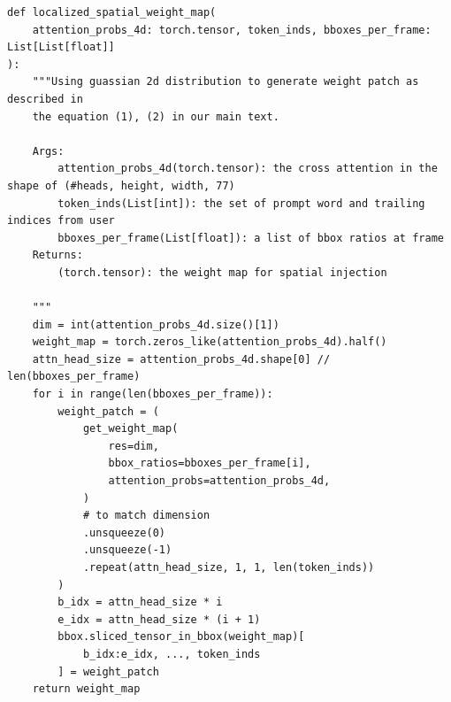 \begin{tiny}
\begin{verbatim}
def localized_spatial_weight_map(
    attention_probs_4d: torch.tensor, token_inds, bboxes_per_frame: List[List[float]]
):
    """Using guassian 2d distribution to generate weight patch as described in
    the equation (1), (2) in our main text.

    Args:
        attention_probs_4d(torch.tensor): the cross attention in the shape of (#heads, height, width, 77)
        token_inds(List[int]): the set of prompt word and trailing indices from user
        bboxes_per_frame(List[float]): a list of bbox ratios at frame
    Returns:
        (torch.tensor): the weight map for spatial injection

    """
    dim = int(attention_probs_4d.size()[1])
    weight_map = torch.zeros_like(attention_probs_4d).half()
    attn_head_size = attention_probs_4d.shape[0] // len(bboxes_per_frame)
    for i in range(len(bboxes_per_frame)):
        weight_patch = (
            get_weight_map(
                res=dim,
                bbox_ratios=bboxes_per_frame[i],
                attention_probs=attention_probs_4d,
            )
            # to match dimension
            .unsqueeze(0)
            .unsqueeze(-1)
            .repeat(attn_head_size, 1, 1, len(token_inds))
        )
        b_idx = attn_head_size * i
        e_idx = attn_head_size * (i + 1)
        bbox.sliced_tensor_in_bbox(weight_map)[
            b_idx:e_idx, ..., token_inds
        ] = weight_patch
    return weight_map
\end{verbatim}
\end{tiny}





